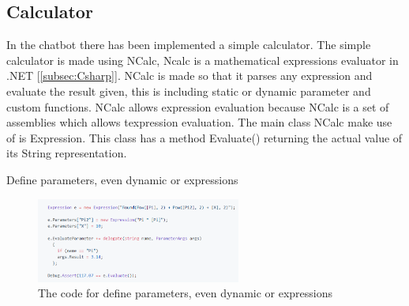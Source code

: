 \subsection{Calculator}
In the chatbot there has been implemented a simple calculator. The simple calculator is made using NCalc, Ncalc is a mathematical expressions evaluator in .NET [\ref{subsec:Csharp}]. NCalc is made so that it parses any expression and evaluate the result given, this is including static or dynamic parameter and custom functions. NCalc  allows expression evaluation because NCalc is a set of assemblies which allows texpression evaluation. The main class NCalc make use of is Expression.  This class has a method Evaluate() returning the actual value of its String representation. \cite{Ncalc}

\noindent Define parameters, even dynamic or expressions
\begin{figure}[H]
    \centering
    \includegraphics[width=0.6\textwidth]{figures/NCalc.png}
    \caption{The code for define parameters, even dynamic or expressions}
    \label{fig:NCalc}
\end{figure}


